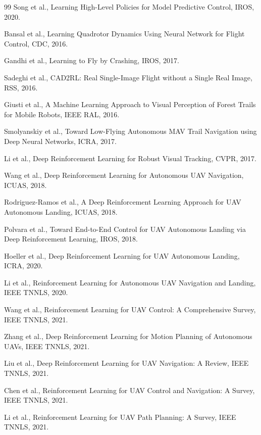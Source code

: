 \documentclass[12pt,a4paper]{ctexart}
\begin{document}
\begin{thebibliography}{99}
 Song et al., Learning High-Level Policies for Model Predictive Control, IROS, 2020.

 Bansal et al., Learning Quadrotor Dynamics Using Neural Network for Flight Control, CDC, 2016.

 Gandhi et al., Learning to Fly by Crashing, IROS, 2017.

 Sadeghi et al., CAD2RL: Real Single-Image Flight without a Single Real Image, RSS, 2016.

 Giusti et al., A Machine Learning Approach to Visual Perception of Forest Trails for Mobile Robots, IEEE RAL, 2016.

 Smolyanskiy et al., Toward Low-Flying Autonomous MAV Trail Navigation using Deep Neural Networks, ICRA, 2017.

 Li et al., Deep Reinforcement Learning for Robust Visual Tracking, CVPR, 2017.

 Wang et al., Deep Reinforcement Learning for Autonomous UAV Navigation, ICUAS, 2018.

 Rodriguez-Ramos et al., A Deep Reinforcement Learning Approach for UAV Autonomous Landing, ICUAS, 2018.

 Polvara et al., Toward End-to-End Control for UAV Autonomous Landing via Deep Reinforcement Learning, IROS, 2018.

 Hoeller et al., Deep Reinforcement Learning for UAV Autonomous Landing, ICRA, 2020.

 Li et al., Reinforcement Learning for Autonomous UAV Navigation and Landing, IEEE TNNLS, 2020.

 Wang et al., Reinforcement Learning for UAV Control: A Comprehensive Survey, IEEE TNNLS, 2021.

 Zhang et al., Deep Reinforcement Learning for Motion Planning of Autonomous UAVs, IEEE TNNLS, 2021.

 Liu et al., Deep Reinforcement Learning for UAV Navigation: A Review, IEEE TNNLS, 2021.

 Chen et al., Reinforcement Learning for UAV Control and Navigation: A Survey, IEEE TNNLS, 2021.

 Li et al., Reinforcement Learning for UAV Path Planning: A Survey, IEEE TNNLS, 2021.


\end{thebibliography}
\end{document}

